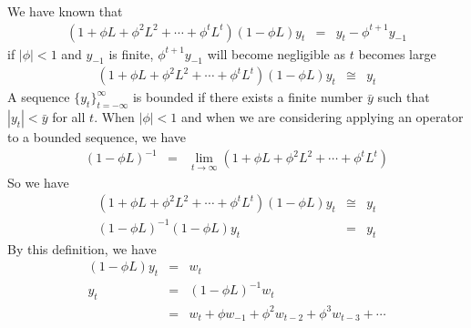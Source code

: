 We have known that
\begin{eqnarray*}
(1+\phi L+\phi^{2}L^{2}+\cdots+\phi^{t}L^{t})(1-\phi L)y_{t}&=&y_{t}-\phi^{t+1}y_{-1}
\end{eqnarray*}
if $|\phi|<1$ and $y_{-1}$ is finite, $\phi^{t+1}y_{-1}$ will become negligible as $t$ becomes large
\begin{eqnarray*}
(1+\phi L+\phi^{2}L^{2}+\cdots+\phi^{t}L^{t})(1-\phi L)y_{t}&\cong&y_{t}
\end{eqnarray*}
A sequence $\{y_{t}\}_{t=-\infty}^{\infty}$ is bounded if there exists a finite number $\bar{y}$ such that $|y_{t}|<\bar{y}$ for all $t$. When $|\phi|<1$ and when we are considering applying an operator to a bounded sequence, we have
\begin{eqnarray*}
(1-\phi L)^{-1}&=&\lim_{t\to\infty} (1+\phi L+\phi^{2}L^{2}+\cdots+\phi^{t}L^{t})
\end{eqnarray*}
So we have
\begin{eqnarray*}
(1+\phi L+\phi^{2}L^{2}+\cdots+\phi^{t}L^{t})(1-\phi L)y_{t}&\cong&y_{t}\\
(1-\phi L)^{-1}(1-\phi L)y_{t}&=&y_{t}
\end{eqnarray*}
By this definition, we have
\begin{eqnarray*}
(1-\phi L)y_{t}&=&w_{t}\\
y_{t}&=&(1-\phi L)^{-1}w_{t}\\
&=&w_{t}+\phi w_{-1}+\phi^{2}w_{t-2}+\phi^{3}w_{t-3}+\cdots
\end{eqnarray*}


